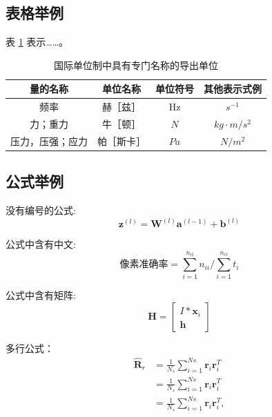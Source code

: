 



\subsection{表格举例}
表 \ref{tab1} 表示……。
\begin{table}[h]
	\centering
	\caption{国际单位制中具有专门名称的导出单位}		
	\label{tab1}
	\begin{tabular}{c|c|c|c}
		\toprule[2pt]
		量的名称 & 单位名称 & 单位符号 & 其他表示式例\\
		\midrule[2pt]
		频率	& 赫［兹］	& Hz	&$s^{-1}$ \\
		\hline                                        %
		力；重力 	& 牛［顿］	& $N$	 & $kg·m/s^2$ \\
		\hline                                         %
		压力，压强；应力	& 帕［斯卡］	&$Pa$	&$N/m^2$ \\
		\bottomrule[2pt]
	\end{tabular}
\end{table}

\subsection{公式举例}
\label{sec:formula}
没有编号的公式:
\begin{equation*}
\bm{z}^{(l)} = \bm{W}^{(l)}\bm{a}^{(l-1)} + \bm{b}^{(l)} 
\end{equation*}

公式中含有中文:
\begin{equation}
\mbox{像素准确率} = \sum_{i=1}^{n_{cl}}n_{ii} / \sum_{i=1}^{n_{cl}}t_i
\end{equation}

公式中含有矩阵:
\begin{equation}
\label{eq1}
\textbf{H} = \begin{bmatrix}
I*\bm{x}_i \\ \textbf{h}
\end{bmatrix}
\end{equation}

多行公式：
\begin{align} 
\hat{\bm{R}}_r 
& =   \frac{1}{N_s} \sum_{i=1}^{Ns} \bm{r}_i \bm{r}_i^T  \label{Eq-2-a} \\
& =   \frac{1}{N_s} \sum_{i=1}^{Ns} \bm{r}_i \bm{r}_i^T  \nonumber \\
& =   \frac{1}{N_s} \sum_{i=1}^{Ns} \bm{r}_i \bm{r}_i^T  \label{Eq-2-c},
\end{align}

